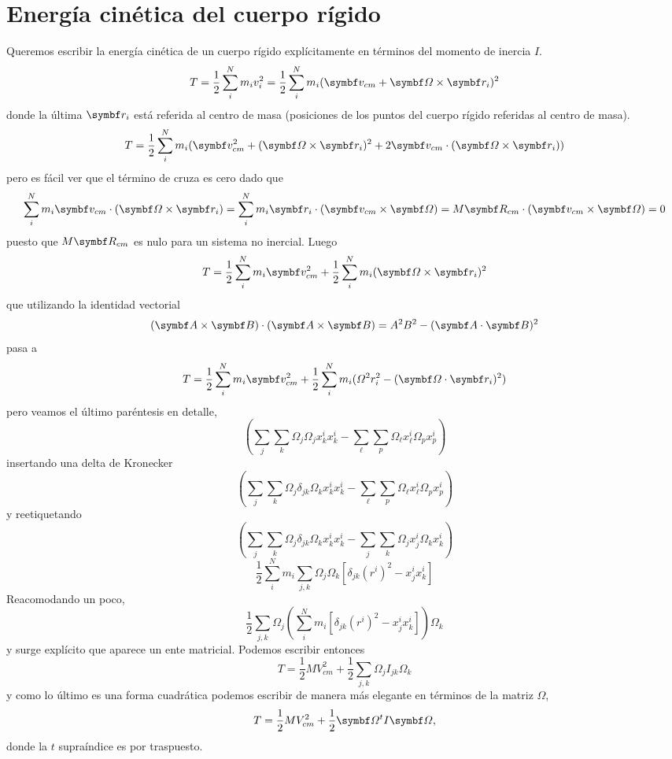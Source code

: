 \documentclass[10pt,oneside]{CBFT_book}
\begin{document}
\section{Energía cinética del cuerpo rígido}

Queremos escribir la energía cinética de un cuerpo rígido explícitamente en términos del momento
de inercia $I$.
\[
	T = \frac{1}{2} \sum_i^N m_i v_i^2 = \frac{1}{2} \sum_i^N m_i ( \vb{v}_{cm} + \vb{\Omega} \times \vb{r}_i ) ^2
\]
donde la última $\vb{r}_i$ está referida al centro de masa (posiciones de los puntos del cuerpo
rígido referidas al centro de masa).
\[
	T = \frac{1}{2} \sum_i^N m_i ( \vb{v}_{cm}^2 + (\vb{\Omega} \times \vb{r}_i)^2 +
		2 \vb{v}_{cm} \cdot (\vb{\Omega} \times \vb{r}_i)  )
\]
pero es fácil ver que el término de cruza es cero dado que 
\[
	\sum_i^N m_i \vb{v}_{cm} \cdot (\vb{\Omega} \times \vb{r}_i) = 
	\sum_i^N m_i \vb{r}_i \cdot ( \vb{v}_{cm} \times \vb{\Omega} ) = 
	M \vb{R}_{cm} \cdot ( \vb{v}_{cm} \times \vb{\Omega} ) = 0
\]
puesto que $M \vb{R}_{cm}$ es nulo para un sistema no inercial. Luego 
\[
	T = \frac{1}{2} \sum_i^N m_i \vb{v}_{cm}^2 + \frac{1}{2} \sum_i^N m_i (\vb{\Omega} \times \vb{r}_i)^2
\]
que utilizando la identidad vectorial
\[
	( \vb{A} \times \vb{B} )\cdot( \vb{A} \times \vb{B} ) =
	A^2 B^2 - (\vb{A} \cdot \vb{B})^2
\]
pasa a 
\[
	T = \frac{1}{2} \sum_i^N m_i \vb{v}_{cm}^2 +
	\frac{1}{2} \sum_i^N m_i ( \Omega^2 r_i^2 - (\vb{\Omega}\cdot\vb{r}_i)^2 )
\]
pero veamos el último paréntesis en detalle,
\[
	\left(\sum_j \sum_k \Omega_j \Omega_j x_k^i x_k^i - 
	\sum_\ell \sum_p \Omega_\ell x_\ell^i \Omega_p x_p^i \right)
\]
insertando una delta de Kronecker
\[
	\left(\sum_j \sum_k \Omega_j \delta_{jk}\Omega_k x_k^i x_k^i - 
	\sum_\ell \sum_p \Omega_\ell x_\ell^i \Omega_p x_p^i \right)
\]
y reetiquetando
\[
	\left(\sum_j \sum_k \Omega_j \delta_{jk}\Omega_k x_k^i x_k^i - 
	\sum_j \sum_k \Omega_j x_j^i \Omega_k x_k^i \right)
\]
\[
	\frac{1}{2} \sum_i^N m_i \sum_{j,k} \Omega_j\Omega_k 
	\left[ \delta_{jk}(r^i)^2 - x^i_j x^i_k \right]
\]
Reacomodando un poco,
\[
	\frac{1}{2} \sum_{j,k}  \Omega_j \left(  \sum_i^N m_i 
	\left[ \delta_{jk}(r^i)^2 - x^i_j x^i_k \right] \right) \Omega_k 
\]
y surge explícito que aparece un ente matricial. Podemos escribir
entonces
\[
	T = \frac{1}{2} M V^2_{cm} + \frac{1}{2} \sum_{j,k} \Omega_j I_{jk} \Omega_k 
\]
y como lo último es una forma cuadrática podemos escribir de manera más elegante
en términos de la matriz $\Omega$,
\[
	T = \frac{1}{2} M V^2_{cm} + \frac{1}{2} \vb{\Omega}^t I \vb{\Omega},
\]
donde la $t$ supraíndice es por traspuesto.
\end{document}
